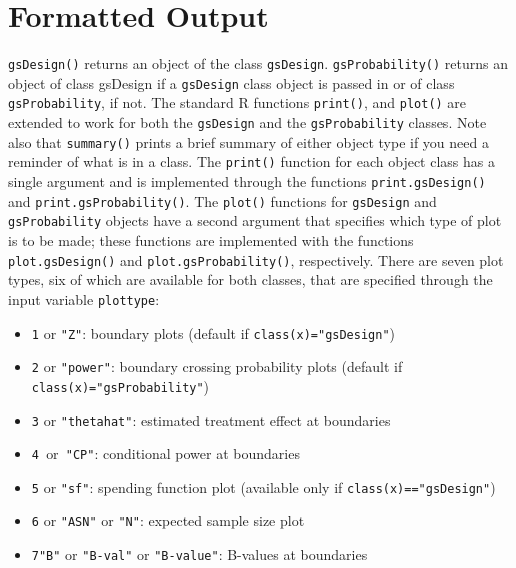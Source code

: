 \section{Formatted Output\label{sec:formatted}}

\texttt{gsDesign()} returns an object of the class \texttt{gsDesign}.
\texttt{gsProbability()} returns an object of class gsDesign if a \texttt{gsDesign} class object is passed in or of class \texttt{gsProbability}, if not. 
The standard R functions \texttt{print()}, and \texttt{plot()} are extended 
to work for both the \texttt{gsDesign} and the \texttt{gsProbability} classes. 
Note also that \texttt{summary()} prints a brief summary of either object 
type if you need a reminder of what is
in a class. The \texttt{print()} function for each object class has a single
argument and is implemented through the functions \texttt{print.gsDesign()}
and \texttt{print.gsProbability()}. The \texttt{plot()} functions for 
\texttt{gsDesign} and \texttt{gsProbability} objects have a second argument 
that specifies which type of
plot is to be made; these functions are implemented with the functions
\texttt{plot.gsDesign()} and \texttt{plot.gsProbability()}, respectively.
There are seven plot types, six of which are available for both classes, 
that are specified through the input variable \texttt{plottype}:

\bigskip

\begin{itemize}
\item \texttt{1} or \texttt{"Z"}: boundary plots (default if
\texttt{class(x)="gsDesign"})

\item \texttt{2} or \texttt{"power"}: boundary crossing probability plots
(default if \texttt{class(x)="gsProbability"})

\item \texttt{3} or \texttt{"thetahat"}: estimated treatment effect at boundaries

\item \texttt{4 }or\texttt{\ "CP"}: conditional power at boundaries

\item \texttt{5} or \texttt{"sf"}: spending function plot (available only if
\texttt{class(x)=="gsDesign"})

\item \texttt{6} or \texttt{"ASN"} or \texttt{"N"}: expected sample size
plot

\item \texttt{7"B"} or \texttt{"B-val"} or \texttt{"B-value"}:  B-values at boundaries
\end{itemize}

